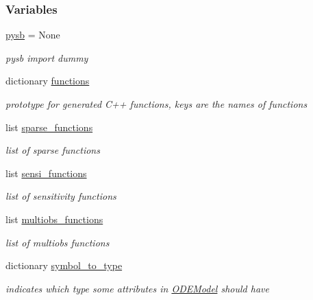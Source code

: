 \subsubsection*{Variables}
\begin{DoxyCompactItemize}
\item 
\mbox{\label{namespaceamici_1_1ode__export_ab2b7137f89298a92623c1c65239eaef2}} 
\mbox{\hyperlink{namespaceamici_1_1ode__export_ab2b7137f89298a92623c1c65239eaef2}{pysb}} = None
\begin{DoxyCompactList}\small\item\em pysb import dummy \end{DoxyCompactList}\item 
dictionary \mbox{\hyperlink{namespaceamici_1_1ode__export_ac310aa598d85b31cc0acea80dcc3c083}{functions}}
\begin{DoxyCompactList}\small\item\em prototype for generated C++ functions, keys are the names of functions \end{DoxyCompactList}\item 
list \mbox{\hyperlink{namespaceamici_1_1ode__export_aa54a407fede674f20bf6ba67fe27177d}{sparse\+\_\+functions}}
\begin{DoxyCompactList}\small\item\em list of sparse functions \end{DoxyCompactList}\item 
list \mbox{\hyperlink{namespaceamici_1_1ode__export_aceecbd374d0134e5683a78e882c3977d}{sensi\+\_\+functions}}
\begin{DoxyCompactList}\small\item\em list of sensitivity functions \end{DoxyCompactList}\item 
list \mbox{\hyperlink{namespaceamici_1_1ode__export_a8a1eabf284172d18098ca450147d94ca}{multiobs\+\_\+functions}}
\begin{DoxyCompactList}\small\item\em list of multiobs functions \end{DoxyCompactList}\item 
dictionary \mbox{\hyperlink{namespaceamici_1_1ode__export_a8faf4dadc2544b8b5dd81c443f66f958}{symbol\+\_\+to\+\_\+type}}
\begin{DoxyCompactList}\small\item\em indicates which type some attributes in \mbox{\hyperlink{classamici_1_1ode__export_1_1_o_d_e_model}{O\+D\+E\+Model}} should have \end{DoxyCompactList}\end{DoxyCompactItemize}


